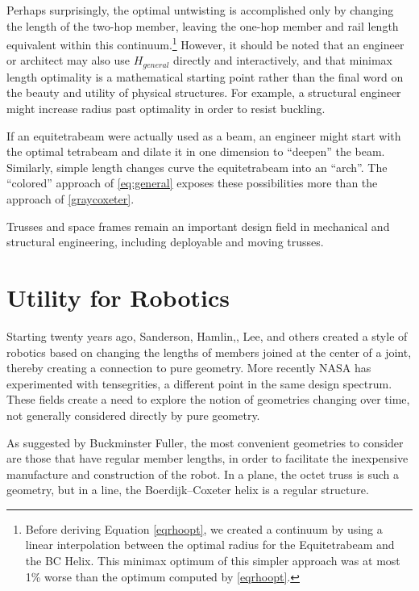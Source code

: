 \documentclass[review]{siamonline1116}
\begin{document}
Perhaps surprisingly, the optimal untwisting is accomplished only by
changing the length of the two-hop member, leaving the one-hop member
and rail length equivalent within this continuum.\footnote{Before deriving Equation \eqref{eqrhoopt}, we created a continuum by
using a linear interpolation between the optimal radius for the
Equitetrabeam and the BC Helix. This minimax optimum of this simpler
approach was at most 1\% worse than the optimum computed by
\eqref{eqrhoopt}.}
 However, it should
be noted that an engineer or architect may also use $H_{general}$
directly and interactively, and that minimax length optimality is a
mathematical starting point rather than the final word on the beauty and utility of
physical structures. For example, a structural engineer might increase
radius past optimality in order to resist buckling.

If an equitetrabeam were actually
used as a beam, an engineer might start with the optimal tetrabeam and
dilate it in one dimension to ``deepen'' the beam. Similarly, simple
length changes curve the equitetrabeam into an ``arch''.
The ``colored'' approach of \cref{eq:general} exposes these possibilities
more than the approach of \cref{graycoxeter}.

Trusses and space frames remain an important design field in
mechanical and structural engineering\cite{mikulas1985sequentially},
including deployable and moving trusses\cite{claypool2012readily}.


\section{Utility for Robotics}

Starting twenty years ago, Sanderson\cite{sanderson1996modular},
Hamlin,\cite{TetrobotBook}, Lee\cite{lee2002dynamic}, and others
 created a style of robotics based on changing
the lengths of members joined at the center of a joint, thereby
creating a connection to pure geometry. More recently NASA has
experimented with tensegrities\cite{NTRT}, a different point in the
same design spectrum. These fields create a need to explore the notion
of geometries changing over time, not generally considered directly by
pure geometry.

As suggested by Buckminster Fuller, the most convenient geometries to
consider are those that have regular member lengths, in order to
facilitate the inexpensive manufacture and construction of the robot.
In a plane, the octet truss\cite{richard1961synergetic} is such a geometry, but in a line, the
Boerdijk--Coxeter helix is a regular structure.
\end{document}
